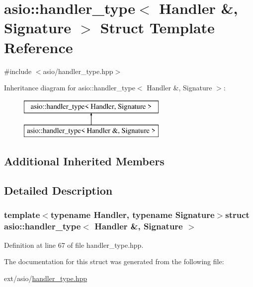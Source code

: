 \hypertarget{structasio_1_1handler__type_3_01_handler_01_6_00_01_signature_01_4}{}\section{asio\+:\+:handler\+\_\+type$<$ Handler \&, Signature $>$ Struct Template Reference}
\label{structasio_1_1handler__type_3_01_handler_01_6_00_01_signature_01_4}


{\ttfamily \#include $<$asio/handler\+\_\+type.\+hpp$>$}

Inheritance diagram for asio\+:\+:handler\+\_\+type$<$ Handler \&, Signature $>$\+:\begin{figure}[H]
\begin{center}
\leavevmode
\includegraphics[height=2.000000cm]{structasio_1_1handler__type_3_01_handler_01_6_00_01_signature_01_4}
\end{center}
\end{figure}
\subsection*{Additional Inherited Members}


\subsection{Detailed Description}
\subsubsection*{template$<$typename Handler, typename Signature$>$struct asio\+::handler\+\_\+type$<$ Handler \&, Signature $>$}



Definition at line 67 of file handler\+\_\+type.\+hpp.



The documentation for this struct was generated from the following file\+:\begin{DoxyCompactItemize}
\item 
ext/asio/\hyperlink{handler__type_8hpp}{handler\+\_\+type.\+hpp}\end{DoxyCompactItemize}
